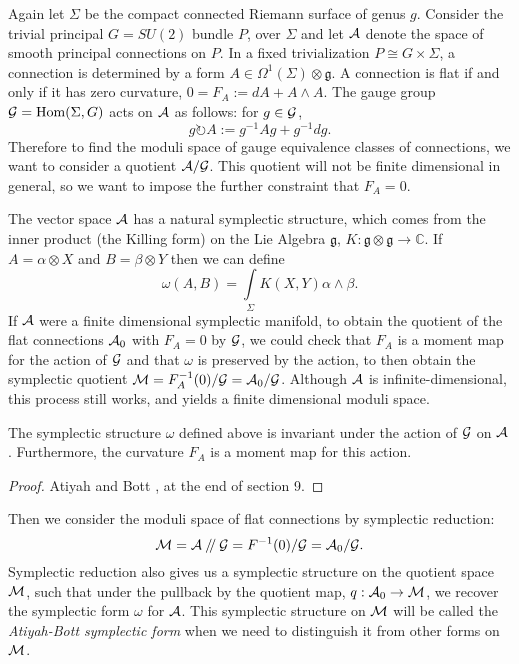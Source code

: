 	Again let $\Sigma$ be the compact connected Riemann surface of genus $g$. Consider the trivial principal $G=SU(2)$ bundle $P$, over $\Sigma$ and let $\mathcal{A}$ denote the space of smooth principal connections on $P$. In a fixed trivialization $P \cong G\times \Sigma$, a connection is determined by a form $A \in \Omega^1(\Sigma)\otimes \mathfrak{g}$. A connection is flat if and only if it has zero curvature, $0 = F_A:= dA + A \wedge A$. The gauge group $\mathcal{G} = \text{Hom}(\Sigma, G)$ acts on $\mathcal{A}$ as follows: for $g\in \mathcal{G}$,
	 \begin{equation}
	 g\circlearrowright A := g^{-1}Ag + g^{-1}dg.
	 \end{equation}
	 Therefore to find the moduli space of gauge equivalence classes of connections, we want to consider a quotient $\mathcal{A}/\mathcal{G}$. This quotient will not be finite dimensional in general, so we want to impose the further constraint that $F_A = 0$. 
	
	The vector space $\mathcal{A}$ has a natural symplectic structure, which comes from the inner product (the Killing form) on the Lie Algebra $\mathfrak{g}$, $K:\mathfrak{g}\otimes\mathfrak{g}\to\mathbb{C}$. If $A = \alpha \otimes X$ and $B = \beta \otimes Y$ then we can define
	\begin{equation}
	\label{e:ab-form}
	\omega(A,B) = \int\limits_\Sigma K(X,Y)\alpha\wedge \beta.
	\end{equation}
	If $\mathcal{A}$ were a finite dimensional symplectic manifold, to obtain the quotient of the flat connections $\mathcal{A}_0$ with $F_A =0$ by $\mathcal{G}$, we could check that $F_A$ is a moment map for the action of $\mathcal{G}$ and that $\omega$ is preserved by the action, to then obtain the symplectic quotient $\mathcal{M} = F_A^{-1}(0)/\mathcal{G} = \mathcal{A}_0/\mathcal{G}$. Although $\mathcal{A}$ is infinite-dimensional, this process still works, and yields a finite dimensional moduli space.
	\begin{theorem}
		The symplectic structure $\omega$ defined above is invariant under the action of $\mathcal{G}$ on $\mathcal{A}$. Furthermore, the curvature $F_A$ is a moment map for this action.
	\end{theorem}
	\begin{proof}
	Atiyah and Bott \cite[\S9]{atiyah_yang-mills_1983}, at the end of section 9.
	\end{proof}
	Then we consider the moduli space of flat connections by symplectic reduction:
	\begin{equation}
	\mathcal{M} = \mathcal{A}\mathbin{/\mkern-4mu/}\mathcal{G} = F^{-1}(0)/ \mathcal{G}= \mathcal{A}_0/ \mathcal{G}.
	\end{equation} 
	Symplectic reduction also gives us a symplectic structure on the quotient space $\mathcal{M}$, such that under the pullback by the quotient map, $q:\mathcal{A}_0 \to \mathcal{M}$, we recover the symplectic form $\omega$ for $\mathcal{A}$. This symplectic structure on $\mathcal{M}$ will be called the \emph{Atiyah-Bott symplectic form} when we need to distinguish it from other forms on $\mathcal{M}$. 

		
	
